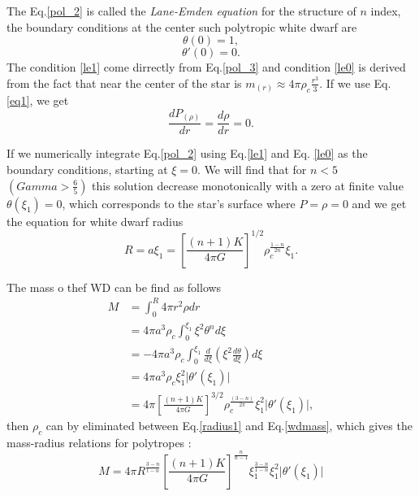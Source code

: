 \documentclass[oneside,a4paper,11pt]{report}
\begin{document}
The Eq.\eqref{pol_2} is called the \textit{Lane-Emden equation} for the structure of $n$ index, the boundary 
conditions at the center such polytropic white dwarf are
\begin{equation}
\label{le1}
 \theta(0) = 1, 
\end{equation}
\begin{equation}
\label{le0}
 \theta'(0)= 0.
\end{equation}
The condition \eqref{le1} come dirrectly from Eq.\eqref{pol_3} and condition \eqref{le0} is derived from the fact 
that near the center of the star is $m_{(r)} \approx 4\pi \rho_c \frac{r^3}{3}$. If we use Eq.\eqref{eq1}, we get
\begin{equation}
 \frac{dP_{(\rho)}}{dr} = \frac{d\rho}{dr} = 0 .
\end{equation}

If we numerically integrate Eq.\eqref{pol_2} using Eq.\eqref{le1} and Eq. \eqref{le0} as the boundary conditions, 
starting at $\xi=0$. We will find that for $n<5$ $(Gamma>\frac{6}{5})$ this solution decrease monotonically with a zero 
at finite value $\theta(\xi_1) = 0$, which corresponds to the star's surface where $P=\rho = 0$ and we get the 
equation for white dwarf radius 
\begin{equation}
 \label{radius1}
R = a\xi_1 = \left[ \frac{(n+1)K}{4\pi G} \right]^{1/2}\rho_c^{\frac{1-n}{2n}}\xi_1.
\end{equation}

The mass o thef WD can be find as follows
\begin{equation}
 \label{wdmass}
\begin{split}
M &= \int_{0}^{R} 4\pi r^2 \rho dr \\
  &= 4 \pi a^3 \rho_c \int_{0}^{\xi_1} \xi^2 \theta^n d\xi \\
  &= -4 \pi a^3 \rho_c \int_{0}^{\xi_1}\frac{d}{d\xi}\left( \xi^2 \frac{d\theta}{d\xi}\right)d\xi \\
  &= 4 \pi a^3 \rho_c \xi_1^2 \lvert \theta' (\xi_1) \lvert \\
  & = 4 \pi \left[ \frac{(n+1)K}{4 \pi G}\right]^{3/2} \rho_c^{\frac{(3-n)}{2\pi}}\xi_1^2 \lvert \theta' (\xi_1)\lvert ,
\end{split}
\end{equation}
then $\rho_c$ can by eliminated between Eq.\eqref{radius1} and Eq.\eqref{wdmass}, which gives the mass-radius relations 
for polytropes \citet{2004bhwd.book.....S}:  
\begin{equation}
\label{mr_eq}
 M = 4 \pi R^{\frac{3-n}{t-n}}\left[ \frac{(n+1)K}{4 \pi G}\right]^{\frac{n}{n-1}}
\xi_1^{\frac{3-n}{1-n}}\xi_1^2\lvert\theta' (\xi_1) \lvert
\end{equation}
\end{document}
